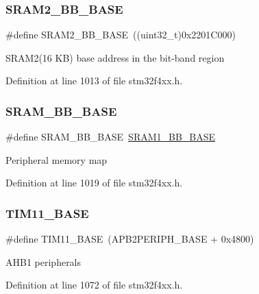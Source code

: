 \subsubsection{\texorpdfstring{S\+R\+A\+M2\+\_\+\+B\+B\+\_\+\+B\+A\+SE}{SRAM2\_BB\_BASE}}
{\footnotesize\ttfamily \#define S\+R\+A\+M2\+\_\+\+B\+B\+\_\+\+B\+A\+SE~((uint32\+\_\+t)0x2201\+C000)}

S\+R\+A\+M2(16 K\+B) base address in the bit-\/band region 

Definition at line 1013 of file stm32f4xx.\+h.

\mbox{\label{group___peripheral__memory__map_gad3548b6e2f017f39d399358f3ac98454}} 
\subsubsection{\texorpdfstring{S\+R\+A\+M\+\_\+\+B\+B\+\_\+\+B\+A\+SE}{SRAM\_BB\_BASE}}
{\footnotesize\ttfamily \#define S\+R\+A\+M\+\_\+\+B\+B\+\_\+\+B\+A\+SE~\hyperlink{group___peripheral__memory__map_gac4c4f61082e4b168f29d9cf97dc3ca5c}{S\+R\+A\+M1\+\_\+\+B\+B\+\_\+\+B\+A\+SE}}

Peripheral memory map 

Definition at line 1019 of file stm32f4xx.\+h.

\mbox{\label{group___peripheral__memory__map_ga3a4a06bb84c703084f0509e105ffaf1d}} 
\subsubsection{\texorpdfstring{T\+I\+M11\+\_\+\+B\+A\+SE}{TIM11\_BASE}}
{\footnotesize\ttfamily \#define T\+I\+M11\+\_\+\+B\+A\+SE~(A\+P\+B2\+P\+E\+R\+I\+P\+H\+\_\+\+B\+A\+SE + 0x4800)}

A\+H\+B1 peripherals 

Definition at line 1072 of file stm32f4xx.\+h.

